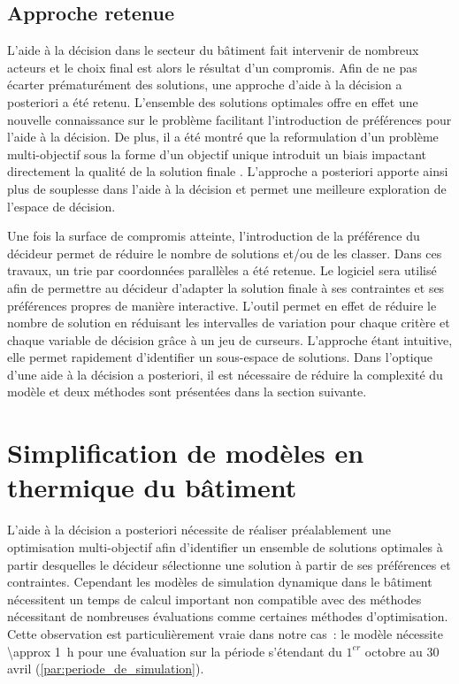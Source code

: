 \subsection{Approche retenue} %
\label{sub:approche_retenue}
L’aide à la décision dans le secteur du bâtiment fait intervenir de nombreux acteurs et le
choix final est alors le résultat d’un compromis. Afin de ne pas écarter prématurément des
solutions, une approche d’aide à la décision a posteriori a été retenu. L’ensemble des
solutions optimales offre en effet une nouvelle connaissance sur le problème facilitant
l’introduction de préférences pour l’aide à la décision. De plus, il a été montré que la
reformulation d’un problème multi-objectif sous la forme d’un objectif unique introduit un
biais impactant directement la qualité de la solution finale \parencite{Blondeau2002165}.
L’approche a posteriori apporte ainsi plus de souplesse dans l’aide à la décision et
permet une meilleure exploration de l’espace de décision.

Une fois la surface de compromis atteinte, l’introduction de la préférence du décideur
permet de réduire le nombre de solutions et/ou de les classer. Dans ces travaux, un trie
par coordonnées parallèles \parencite{Inselberg198725} a été retenue. Le logiciel
 sera utilisé afin de permettre au décideur d’adapter la
solution finale à ses contraintes et ses préférences propres de manière interactive.
L’outil permet en effet de réduire le nombre de solution en réduisant les intervalles de variation
pour chaque critère et chaque variable de décision grâce à un jeu de curseurs. L’approche
étant intuitive, elle permet rapidement d’identifier un sous-espace de solutions.
Dans l’optique d’une aide à la décision a posteriori, il est nécessaire de réduire la
complexité du modèle et deux méthodes sont présentées dans la section suivante.




\section{Simplification de modèles en thermique du bâtiment} %
\label{sec:simplification_de_modeles_en_thermique_du_batiment}
L’aide à la décision a posteriori nécessite de réaliser préalablement une optimisation
multi-objectif afin d’identifier un ensemble de solutions optimales à partir desquelles le
décideur sélectionne une solution à partir de ses préférences et contraintes.
Cependant les modèles de simulation dynamique dans le bâtiment nécessitent un temps de calcul
important non compatible avec des méthodes nécessitant de nombreuses évaluations comme
certaines méthodes d’optimisation. Cette observation est particulièrement vraie dans notre
cas~: le modèle nécessite \SI{\approx 1}{\hour} pour une évaluation sur la période s’étendant
du $1^{er}$ octobre au $30$ avril (\ref{par:periode_de_simulation}).

